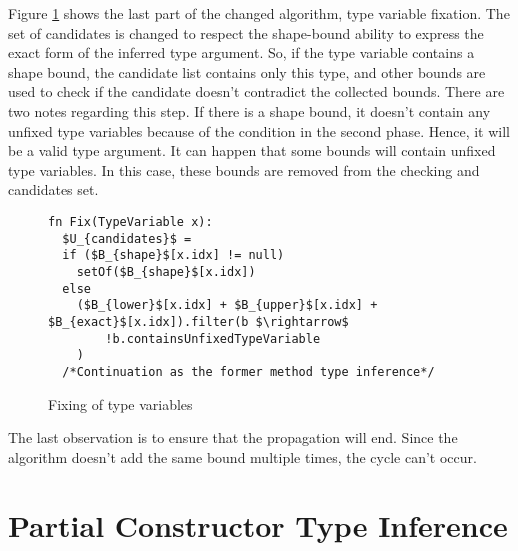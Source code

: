 Figure \ref{img55::mainTypeInference3} shows the last part of the changed algorithm, type variable fixation. 
The set of candidates is changed to respect the shape-bound ability to express the exact form of the inferred type argument. 
So, if the type variable contains a shape bound, the candidate list contains only this type, and other bounds are used to check if the candidate doesn’t contradict the collected bounds. 
There are two notes regarding this step. 
If there is a shape bound, it doesn’t contain any unfixed type variables because of the condition in the second phase. 
Hence, it will be a valid type argument. It can happen that some bounds will contain unfixed type variables. 
In this case, these bounds are removed from the checking and candidates set.
\begin{figure}[h!]
\begin{lstlisting}[style=myAlgo, mathescape=true]
fn Fix(TypeVariable x):
  $U_{candidates}$ = 
  if ($B_{shape}$[x.idx] != null)
    setOf($B_{shape}$[x.idx])
  else
    ($B_{lower}$[x.idx] + $B_{upper}$[x.idx] + $B_{exact}$[x.idx]).filter(b $\rightarrow$
        !b.containsUnfixedTypeVariable
    )
  /*Continuation as the former method type inference*/
\end{lstlisting}
\caption{Fixing of type variables}
\label{img55::mainTypeInference3}
\end{figure}
\par
\begin{obs}
The last observation is to ensure that the propagation will end.
Since the algorithm doesn't add the same bound multiple times, the cycle can't occur.
\end{obs}

\section{Partial Constructor Type Inference}

